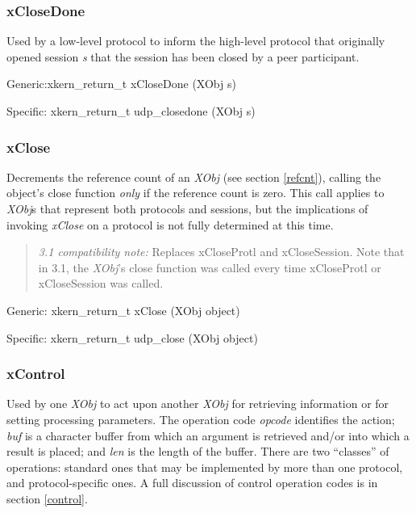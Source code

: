 \subsubsection{xCloseDone}

\noindent Used by a low-level protocol to inform the high-level protocol 
that originally opened session {\em s} that the session has been closed by
a peer participant.
\medskip

{\sanss Generic:}{\sem xkern\_return\_t} {\bold xCloseDone} ({\sem XObj} {\caps s})
\medskip				

{\sanss Specific:} {\sem xkern\_return\_t} {\bold udp\_closedone} ({\sem XObj} {\caps s})

\subsubsection{xClose}

\noindent Decrements the reference count of an {\em XObj} (see section
\ref{refcnt}), calling the object's close function {\em only} if the
reference count is zero. This call applies to {\em XObj}s that represent
both protocols and sessions, but the implications of invoking {\em xClose}
on a protocol is not fully determined at this time.

\begin{quote}
{\em 3.1 compatibility note:} Replaces xCloseProtl and xCloseSession.
Note that in 3.1, the {\em XObj}'s close function was called every
time xCloseProtl or xCloseSession was called.
\end{quote}
\medskip

{\sanss Generic:} {\sem xkern\_return\_t} {\bold xClose} ({\sem XObj} {\caps object})
\medskip

{\sanss Specific:} {\sem xkern\_return\_t} {\bold udp\_close} ({\sem XObj} {\caps object})

\subsubsection{xControl}

Used by one {\em XObj} to act upon another {\em XObj} for retrieving
information or for setting processing parameters.  The operation code
{\em opcode} identifies the action; {\em buf} is a character buffer
from which an argument is retrieved and/or into which a result is
placed; and {\em len} is the length of the buffer.  There are two
``classes'' of operations: standard ones that may be implemented by
more than one protocol, and protocol-specific ones.  A full discussion
of control operation codes is in section \ref{control}.

